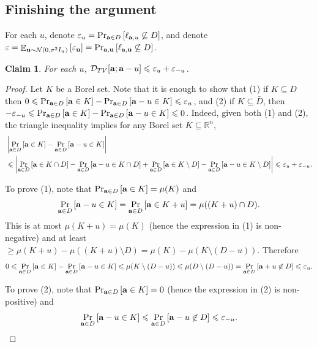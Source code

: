 \documentclass[10pt,a4paper]{article}
\newtheorem{claim}[thm]{Claim}
\newcommand\card[1]{\left| {#1} \right|}
\newcommand\Prob[2]{{\Pr_{#1}\left[ {#2} \right]}}
\newcommand\Expect[2]{{\mathop{\mathbb{E}}_{#1}\left[ {#2} \right]}}
\newcommand\eps{\varepsilon}
\renewcommand\geq{\geqslant}
\renewcommand\leq{\leqslant}
\begin{document}
\subsection{Finishing the argument}
For each $u$, denote $\eps_u = \Prob{{\bf a}\in D}{\ell_{{\bf a},u}\not\subseteq D}$,
and denote $\eps = \Expect{{\bf u}\sim\mathcal{N}(0,\sigma^2 I_n)}{\eps_{\bf u}} = \Prob{{\bf a}, {\bf u}}{\ell_{{\bf a}, {\bf u}}\not\subseteq D}$.
\begin{claim}\label{cl:tv5}
For each $u$, $\mathcal{D}_{TV}[{\bf a}; {\bf a}-u]\leq \eps_u + \eps_{-u}$.
\end{claim}
\begin{proof}
  Let $K$ be a Borel set.
  Note that it is enough to show that
  (1) if $K\subseteq D$ then $0\leq \Prob{{\bf a}\in D}{{\bf a}\in K} - \Prob{{\bf a}\in D}{{\bf a}-u\in K}\leq \eps_u$,
  and (2) if $K\subseteq\bar{D}$, then $-\eps_{-u}\leq \Prob{{\bf a}\in D}{{\bf a}\in K} - \Prob{{\bf a}\in D}{{\bf a}-u\in K}\leq 0$.
  Indeed, given both (1) and (2), the triangle inequality implies for any Borel set $K\subseteq\mathbb{R}^n$,
  \begin{align*}
  &\card{\Prob{{\bf a}\in D}{{\bf a}\in K} - \Prob{{\bf a}\in D}{{\bf a}-u\in K}}\\
  &\leq
  \card{
  \Prob{{\bf a}\in D}{{\bf a}\in K\cap D}-\Prob{{\bf a}\in D}{{\bf a}-u\in K\cap D}
  +\Prob{{\bf a}\in D}{{\bf a}\in K\setminus D}-\Prob{{\bf a}\in D}{{\bf a}-u\in K\setminus D}}
  \leq \eps_u+\eps_{-u}.
  \end{align*}

  To prove (1), note that
  $\Prob{{\bf a}\in D}{{\bf a}\in K}=\mu(K)$
  and
  \[
  \Prob{{\bf a}\in D}{{\bf a}-u\in K} = \Prob{{\bf a}\in D}{{\bf a}\in K+u} = \mu((K+u)\cap D).
  \]
  This is at most $\mu(K+u) = \mu(K)$ (hence the expression in (1) is non-negative)
  and at least $\geq \mu(K+u) - \mu((K+u)\setminus D)= \mu(K) - \mu(K\setminus (D-u))$.
  Therefore
  \[
  0\leq \Prob{{\bf a}\in D}{{\bf a}\in K} - \Prob{{\bf a}\in D}{{\bf a}-u\in K}
  \leq \mu(K\setminus (D-u))
  \leq \mu(D\setminus (D-u))
  = \Prob{{\bf a}\in D}{{\bf a}+u\not\in D}
  \leq \eps_u.
  \]

  To prove (2), note that $\Prob{{\bf a}\in D}{{\bf a}\in K} = 0$ (hence the expression in (2) is non-positive)
  and
  \[
  \Prob{{\bf a}\in D}{{\bf a}-u\in K} \leq \Prob{{\bf a}\in D}{{\bf a}-u\not\in D} \leq \eps_{-u}.\qedhere
  \]
\end{proof}
\end{document}

